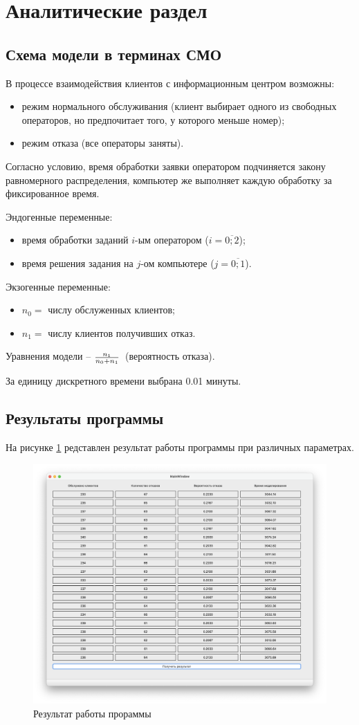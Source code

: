 \section{Аналитические раздел}

\subsection{Схема модели в терминах СМО}

В процессе взаимодействия клиентов с информационным центром возможны:

\begin{itemize}
	\item режим нормального обслуживания (клиент выбирает одного из свободных операторов, но предпочитает того, у которого меньше номер);
	\item режим отказа (все операторы заняты).
\end{itemize}
Согласно условию, время обработки заявки оператором подчиняется закону равномерного распределения, компьютер же выполняет каждую обработку за фиксированное время.

Эндогенные переменные:

\begin{itemize}
	\item время обработки заданий $i$-ым оператором ($i = \overline{0;2}$);
	\item время решения задания на $j$-ом компьютере ($j = \overline{0;1}$).
\end{itemize}

Экзогенные переменные:

\begin{itemize}
	\item $n_0 =$ числу обслуженных клиентов;
	\item $n_1 =$ числу клиентов получивших отказ.
\end{itemize}

Уравнения модели – $\Large \frac{n_1}{n_0+n_1}$ (вероятность отказа).

За единицу дискретного времени выбрана 0.01 минуты.

\subsection{Результаты программы}


На рисунке \ref{fig:r2} редставлен результат работы программы при различных параметрах.

\begin{figure}[ht!]
	\includegraphics[width=0.75\linewidth]{assets/images/lab-5.png}
	\caption{Результат работы прораммы}
	\label{fig:r2}
\end{figure}